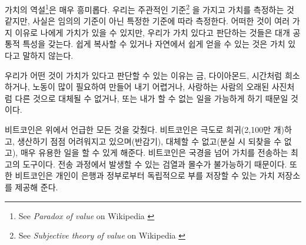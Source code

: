 \begin{comment}
	This paradox of value\footnote{See \textit{Paradox of value} on Wikipedia
		\cite{wiki:paradox-of-value}} shows something interesting about us humans: we
	seem to value things on a subjective\footnote{See \textit{Subjective theory of
			value} on Wikipedia \cite{wiki:subjective-theory-of-value}} basis, but do so
	with certain non-arbitrary criteria. Something might be \textit{precious} to us
	for a variety of reasons, but things we value do share certain characteristics.
	If we can copy something very easily, or if it is naturally abundant, we do not
	value it.
\end{comment}
가치의 역설\footnote{See \textit{Paradox of value} on Wikipedia \cite{wiki:paradox-of-value}}은 
매우 흥미롭다. 우리는 주관적인 기준\footnote{See \textit{Subjective theory of	value} on Wikipedia \cite{wiki:subjective-theory-of-value}}
을 가지고 가치를 측정하는 것 같지만,
사실은 임의의 기준이 아닌 특정한 기준에 따라 측정한다. 
어떠한 것이 여러 가지 이유로 나에게 가치가 있을 수 있지만, 우리가 가치 있다고 판단하는 것들은 대개 공통적 특성을 갖는다.
쉽게 복사할 수 있거나 자연에서 쉽게 얻을 수  있는 것은 가치 있다고 말하지 않는다. 

\begin{comment}
	It seems that we value something because it is scarce (gold, diamonds,
	time), difficult or labor-intensive to produce, can't be replaced (an
	old photograph of a loved one), is useful in a way in which it enables
	us to do things which we otherwise couldn't, or a combination of those,
	such as great works of art.
\end{comment}
우리가 어떤 것이 가치가 있다고 판단할 수 있는 이유는 
금, 다이아몬드, 시간처럼 희소하거나,
노동이 많이 필요하여 만들어 내기 어렵거나, 
사랑하는 사람의 오래된 사진처럼 다른 것으로 대체될 수 없거나,
또는 내가 할  수 없는 일을 가능하게 하기 때문일 것이다. 

\begin{comment}
	Bitcoin is all of the above: it is extremely rare (21 million),
	increasingly hard to produce (reward halvening), can't be replaced (a
	lost private key is lost forever), and enables us to do some quite
	useful things. It is arguably the best tool for value transfer across
	borders, virtually resistant to censorship and confiscation in the
	process, plus, it is a self-sovereign store of value, allowing
	individuals to store their wealth independent of banks and governments,
	just to name two.
\end{comment}
비트코인은 위에서 언급한 모든 것을 갖췄다. 
비트코인은 극도로 희귀(2,100만 개)하고,
생산하기 점점 어려워지고 있으며(반감기),
대체할 수 없고(분실 시 되찾을 수 없고),
매우 유용한 일을 할 수 있게 해준다. 
비트코인은 국경을 넘어 가치를 전송하는 최고의 도구이다. 
전송 과정에서 발생할 수 있는 검열과 몰수가 불가능하기 때문이다. 
또한 비트코인은 개인이 은행과 정부로부터 독립적으로 부를 저장할 수 있는 가치 저장소를 제공해 준다.


